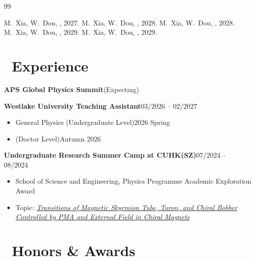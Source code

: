 \documentclass[svgnames, legalpaper]{article}
\newcommand \itemdate [2]{\noindent {\large\enspace} \textbf{#1}\hfill #2}
\begin{document}
\renewcommand{\refname}{\makebox[1em][l]{\texttwemoji{1fab6}}~Publications}
\begin{thebibliography}{99}

\textcolor{gray!50}{%
M.~Xia, W.~Dou,
, 2027.}
\textcolor{gray!50}{%
M.~Xia, W.~Dou,
, 2028.}
\textcolor{gray!50}{%
M.~Xia, W.~Dou,
, 2028.}
\textcolor{gray!50}{%
M.~Xia, W.~Dou,
, 2029.}
\textcolor{gray!50}{%
M.~Xia, W.~Dou,
, 2029.}

\end{thebibliography}

\section*{~Experience}

\begingroup
\color{gray!50}
\itemdate{APS Global Physics Summit}{(Expecting)}
\endgroup

\itemdate{Westlake University Teaching Assistant}
  {03/2026 -- 02/2027}
\begin{itemize}
  \item General Physics (Undergraduate Level)\hfill 2026 Spring\color{gray!50}
  \item (Doctor Level)\hfill Autumn 2026
\end{itemize}

\itemdate{Undergraduate Research Summer Camp at CUHK(SZ)}
  {07/2024 -- 08/2024}
\begin{itemize}
  \item School of Science and Engineering, Physics Programme  \hfill Academic Exploration Award
  \item Topic: \ul{\emph{Transitions of Magnetic Skyrmion Tube, Toron,
  and Chiral Bobber Controlled by PMA and External Field in Chiral Magnets}}
\end{itemize}

\section*{~Honors \& Awards}
\end{document}

